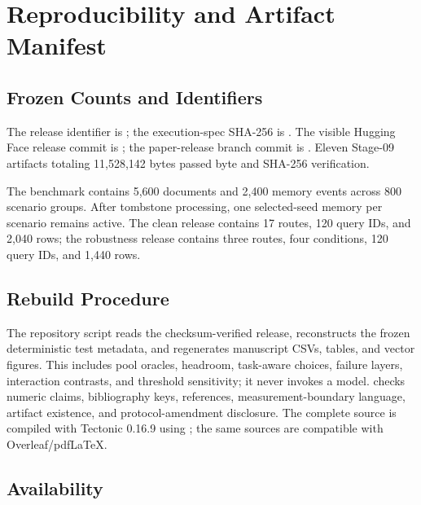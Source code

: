 \section{Reproducibility and Artifact Manifest}
\label{app:reproducibility}

\subsection{Frozen Counts and Identifiers}

The release identifier is ; the execution-spec SHA-256
is .
The visible Hugging Face release commit is
; the paper-release branch commit is
. Eleven Stage-09 artifacts totaling
11,528,142 bytes passed byte and SHA-256 verification.

The benchmark contains 5,600 documents and 2,400 memory events across 800 scenario
groups. After tombstone processing, one selected-seed memory per scenario remains
active. The clean release contains 17 routes, 120 query IDs, and 2,040 rows; the
robustness release contains three routes, four conditions, 120 query IDs, and 1,440
rows.

\subsection{Rebuild Procedure}

The repository script  reads the
checksum-verified release, reconstructs the frozen deterministic test metadata, and
regenerates manuscript CSVs, tables, and vector figures. This includes pool oracles,
headroom, task-aware choices, failure layers, interaction contrasts, and threshold
sensitivity; it never invokes a model.  checks numeric claims,
bibliography keys, references, measurement-boundary language, artifact existence,
and protocol-amendment disclosure. The complete source is compiled with Tectonic
0.16.9 using ; the same sources are compatible
with Overleaf/pdfLaTeX.

\subsection{Availability}

